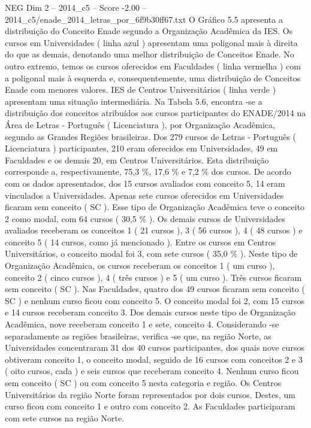 \begin{textsample}{NEG Dim 2 – 2014\_c5 – Score -2.00 – 2014\_c5/enade\_2014\_letras\_por\_6f9b30ff67.txt}
O Gráfico 5.5 apresenta a distribuição do Conceito Enade segundo a Organização Acadêmica da IES.
Os cursos em Universidades ( linha azul ) apresentam uma poligonal mais à direita do que as demais, denotando uma melhor distribuição de Conceitos Enade.
No outro extremo, temos os cursos oferecidos em Faculdades ( linha vermelha ) com a poligonal mais à esquerda e, consequentemente, uma distribuição de Conceitos Enade com menores valores.
IES de Centros Universitários ( linha verde ) apresentam uma situação intermediária.
Na Tabela 5.6, encontra -se a distribuição dos conceitos atribuídos aos cursos participantes do ENADE/2014 na Área de Letras - Português ( Licenciatura ), por Organização Acadêmica, segundo as Grandes Regiões brasileiras.
Dos 279 cursos de Letras - Português ( Licenciatura ) participantes, 210 eram oferecidos em Universidades, 49 em Faculdades e os demais 20, em Centros Universitários.
Esta distribuição corresponde a, respectivamente, 75,3 \%, 17,6 \% e 7,2 \% dos cursos.
De acordo com os dados apresentados, dos 15 cursos avaliados com conceito 5, 14 eram vinculados a Universidades.
Apenas sete cursos oferecidos em Universidades ficaram sem conceito ( SC ).
Esse tipo de Organização Acadêmica teve o conceito 2 como modal, com 64 cursos ( 30,5 \% ).
Os demais cursos de Universidades avaliados receberam os conceitos 1 ( 21 cursos ), 3 ( 56 cursos ), 4 ( 48 cursos ) e conceito 5 ( 14 cursos, como já mencionado ).
Entre os cursos em Centros Universitários, o conceito modal foi 3, com sete cursos ( 35,0 \% ).
Neste tipo de Organização Acadêmica, os cursos receberam os conceitos 1 ( um curso ), conceito 2 ( cinco cursos ), 4 ( três cursos ) e 5 ( um curso ).
Três cursos ficaram sem conceito ( SC ).
Nas Faculdades, quatro dos 49 cursos ficaram sem conceito ( SC ) e nenhum curso ficou com conceito 5.
O conceito modal foi 2, com 15 cursos e 14 cursos receberam conceito 3.
Dos demais cursos neste tipo de Organização Acadêmica, nove receberam conceito 1 e sete, conceito 4.
Considerando -se separadamente as regiões brasileiras, verifica -se que, na região Norte, as Universidades concentraram 31 dos 40 cursos participantes, dos quais nove cursos obtiveram conceito 1, o conceito modal, seguido de 16 cursos com conceitos 2 e 3 ( oito cursos, cada ) e seis cursos que receberam conceito 4.
Nenhum curso ficou sem conceito ( SC ) ou com conceito 5 nesta categoria e região.
Os Centros Universitários da região Norte foram representados por dois cursos.
Destes, um curso ficou com conceito 1 e outro com conceito 2.
As Faculdades participaram com sete cursos na região Norte.

\end{textsample}
